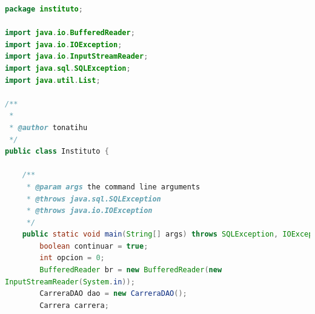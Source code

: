\documentclass[a4paper,12pt]{article}
\begin{document}
\begin{lstlisting}[language=Java, style=customJava, 
caption={Instituto.java},captionpos=b,basicstyle=\fontfamily{cmss}\small]
package instituto;

import java.io.BufferedReader;
import java.io.IOException;
import java.io.InputStreamReader;
import java.sql.SQLException;
import java.util.List;

/**
 *
 * @author tonatihu
 */
public class Instituto {

    /**
     * @param args the command line arguments
     * @throws java.sql.SQLException
     * @throws java.io.IOException
     */
    public static void main(String[] args) throws SQLException, IOException {
        boolean continuar = true;
        int opcion = 0;
        BufferedReader br = new BufferedReader(new 
InputStreamReader(System.in));
        CarreraDAO dao = new CarreraDAO();
        Carrera carrera;


\end{lstlisting}
\end{document}

